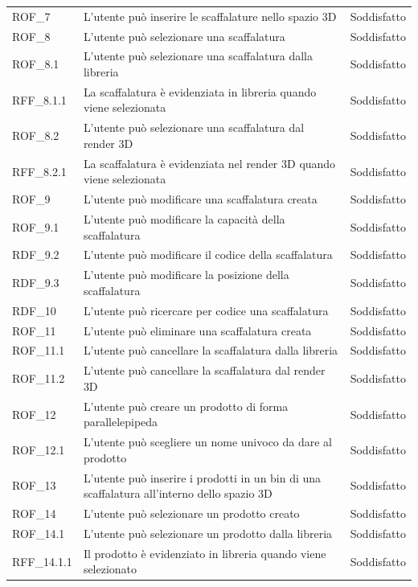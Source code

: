 \begin{xltabular}{\textwidth}{ p{0.1\textwidth} | X | p{0.3\textwidth} }
    ROF\_7 & L'utente può inserire le scaffalature nello spazio 3D & Soddisfatto\\
    ROF\_8 & L'utente può selezionare una scaffalatura & Soddisfatto\\
    ROF\_8.1 & L'utente può selezionare una scaffalatura dalla libreria & Soddisfatto\\
    RFF\_8.1.1 & La scaffalatura è evidenziata in libreria quando viene selezionata & Soddisfatto\\
    ROF\_8.2 & L'utente può selezionare una scaffalatura dal render 3D & Soddisfatto\\
    RFF\_8.2.1 & La scaffalatura è evidenziata nel render 3D quando viene selezionata & Soddisfatto\\
    ROF\_9 & L'utente può modificare una scaffalatura creata & Soddisfatto\\
    ROF\_9.1 & L'utente può modificare la capacità della scaffalatura & Soddisfatto\\
    RDF\_9.2 & L'utente può modificare il codice della scaffalatura & Soddisfatto\\
    RDF\_9.3 & L'utente può modificare la posizione della scaffalatura & Soddisfatto\\
    RDF\_10 & L'utente può ricercare per codice una scaffalatura & Soddisfatto\\
    ROF\_11 & L'utente può eliminare una scaffalatura creata & Soddisfatto\\
    ROF\_11.1 & L'utente può cancellare la scaffalatura dalla libreria & Soddisfatto\\
    ROF\_11.2 & L'utente può cancellare la scaffalatura dal render 3D & Soddisfatto\\
    ROF\_12 & L'utente può creare un prodotto di forma parallelepipeda & Soddisfatto\\
    ROF\_12.1 & L'utente può scegliere un nome univoco da dare al prodotto & Soddisfatto\\
    ROF\_13 & L'utente può inserire i prodotti in un bin di una scaffalatura all'interno dello spazio 3D & Soddisfatto\\
    ROF\_14 & L'utente può selezionare un prodotto creato & Soddisfatto\\
    ROF\_14.1 & L'utente può selezionare un prodotto dalla libreria & Soddisfatto\\
    RFF\_14.1.1 & Il prodotto è evidenziato in libreria quando viene selezionato & Soddisfatto\\

\end{xltabular}
